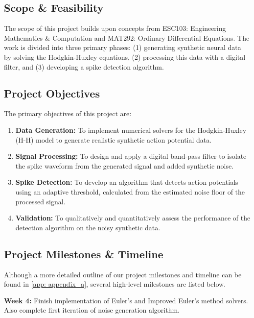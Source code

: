 \documentclass{article} %
\begin{document}
\begin{multicols}{2}
\section{Scope \& Feasibility}
\label{sec: scope_feasibility}

The scope of this project builds upon concepts from ESC103: Engineering Mathematics \& Computation and MAT292: Ordinary Differential Equations. 
The work is divided into three primary phases: (1) generating synthetic neural data by solving the Hodgkin-Huxley equations, (2) processing this data with a digital filter, and (3) developing a spike detection algorithm.

\subsection{Project Objectives}
\label{subsec: project_objectives}

The primary objectives of this project are:
\begin{enumerate}
    \item \textbf{Data Generation:} To implement numerical solvers for the Hodgkin-Huxley (H-H) model to generate realistic synthetic action potential data.
    \item \textbf{Signal Processing:} To design and apply a digital band-pass filter to isolate the spike waveform from the generated signal and added synthetic noise.
    \item \textbf{Spike Detection:} To develop an algorithm that detects action potentials using an adaptive threshold, calculated from the estimated noise floor of the processed signal.
    \item \textbf{Validation:} To qualitatively and quantitatively assess the performance of the detection algorithm on the noisy synthetic data.
\end{enumerate}

\subsection{Project Milestones \& Timeline}
\label{subsec:milestones_timeline}

Although a more detailed outline of our project milestones and timeline can be found in \ref{app: appendix_a}, several high-level milestones are listed below.

\textbf{Week 4: } Finish implementation of Euler's and Improved Euler's method solvers. Also complete first iteration of noise generation algorithm.


\end{multicols}
\end{document}
